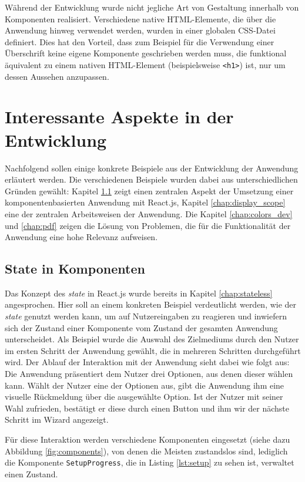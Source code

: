 Während der Entwicklung wurde nicht jegliche Art von Gestaltung innerhalb von Komponenten realisiert. Verschiedene native HTML-Elemente, die über die Anwendung hinweg verwendet werden, wurden in einer globalen CSS-Datei definiert. Dies hat den Vorteil, dass zum Beispiel für die Verwendung einer Überschrift keine eigene Komponente geschrieben werden muss, die funktional äquivalent zu einem nativen HTML-Element (beispielsweise \texttt{<h1>}) ist, nur um dessen Aussehen anzupassen.

\section{Interessante Aspekte in der Entwicklung}
Nachfolgend sollen einige konkrete Beispiele aus der Entwicklung der Anwendung erläutert werden. Die verschiedenen Beispiele wurden dabei aus unterschiedlichen Gründen gewählt:
Kapitel \ref{chap:state_component} zeigt einen zentralen Aspekt der Umsetzung einer komponentenbasierten Anwendung mit React.js, Kapitel \ref{chap:display_scope} eine der zentralen Arbeitsweisen der Anwendung. Die Kapitel \ref{chap:colors_dev} und \ref{chap:pdf} zeigen die Lösung von Problemen, die für die Funktionalität der Anwendung eine hohe Relevanz aufweisen.


\subsection{State in Komponenten}
\label{chap:state_component}
Das Konzept des \textit{state} in React.js wurde bereits in Kapitel \ref{chap:stateless} angesprochen. Hier soll an einem konkreten Beispiel verdeutlicht werden, wie der \textit{state} genutzt werden kann, um auf Nutzereingaben zu reagieren und inwiefern sich der Zustand einer Komponente vom Zustand der gesamten Anwendung unterscheidet.
Als Beispiel wurde die Auswahl des Zielmediums durch den Nutzer im ersten Schritt der Anwendung gewählt, die in mehreren Schritten durchgeführt wird.
Der Ablauf der Interaktion mit der Anwendung sieht dabei wie folgt aus:
Die Anwendung präsentiert dem Nutzer drei Optionen, aus denen dieser wählen kann. Wählt der Nutzer eine der Optionen aus, gibt die Anwendung ihm eine visuelle Rückmeldung über die ausgewählte Option. Ist der Nutzer mit seiner Wahl zufrieden, bestätigt er diese durch einen Button und  ihm wir der nächste Schritt im Wizard angezeigt.

Für diese Interaktion werden verschiedene Komponenten eingesetzt (siehe dazu Abbildung \ref{fig:components}), von denen die Meisten zustandslos sind, lediglich die Komponente \texttt{SetupProgress}, die in Listing \ref{lst:setup} zu sehen ist\footnotemark{}, verwaltet einen Zustand.

